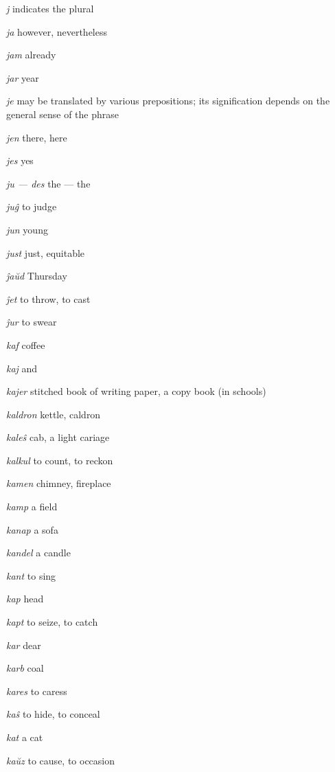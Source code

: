 \begin{landscape}
\begin{multicols}{5}

\begin{outdent}{1em}
\emph{j  }indicates the plural

\emph{ja}  however, nevertheless

\emph{jam}  already

\emph{jar}  year

\emph{je}  may be translated by various prepositions; its signification depends on the general sense of the phrase

\emph{jen}  there, here

\emph{jes}  yes

\emph{ju — des}  the — the

\emph{juĝ } to judge

\emph{jun}  young

\emph{just}  just, equitable


\emph{ĵaŭd}  Thursday

\emph{ĵet } to throw, to cast

\emph{ĵur}  to swear
\end{outdent}


\begin{outdent}{1em}
\emph{kaf } coffee

\emph{kaj}  and

\emph{kajer}  stitched book of writing paper, a copy book (in schools)

\emph{kaldron } kettle, caldron

\emph{kaleŝ}  cab, a light cariage

\emph{kalkul}  to count, to reckon

\emph{kamen}  chimney, fireplace

\emph{kamp}  a field

\emph{kanap}  a sofa

\emph{kandel}  a candle

\emph{kant}  to sing

\emph{kap } head

\emph{kapt}  to seize, to catch

\emph{kar}  dear

\emph{karb}  coal

\emph{kares } to caress

\emph{kaŝ } to hide, to conceal

\emph{kat}  a cat

\emph{kaŭz}  to cause, to occasion


\end{outdent}
\end{multicols}
\end{landscape}
